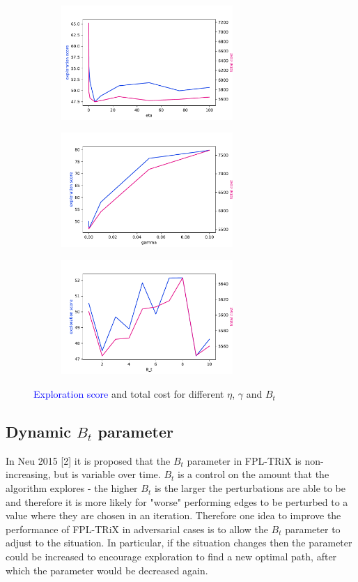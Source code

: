 \begin{figure}[h!]
\centering
\begin{subfigure}{.5\textwidth}
  \centering
  \includegraphics[width=65mm]{../plots/eta_expl_cost.pdf}
\end{subfigure}%
\begin{subfigure}{.5\textwidth}
  \centering
  \includegraphics[width=65mm]{../plots/gamma_expl_cost.pdf}
\end{subfigure}
\begin{subfigure}{.5\textwidth}
  \centering
  \includegraphics[width=65mm]{../plots/Bt_expl_cost.pdf}
\end{subfigure}
\caption{\textcolor{blue}{Exploration score} and \textcolor{RubineRed}{total cost} for different $\eta$, $\gamma$ and $B_t$}
\label{fig:ullm-particle}
\end{figure}


\subsection{Dynamic $B_t$ parameter}

In Neu 2015 [2] it is proposed that the $B_t$ parameter in FPL-TRiX is non-increasing, but is variable over time. $B_t$ is a control on the amount that the algorithm explores - the higher $B_t$ is the larger the perturbations are able to be and therefore it is more likely for "worse" performing edges to be perturbed to a value where they are chosen in an iteration. Therefore   one idea to improve the performance of FPL-TRiX in adversarial cases is to allow the $B_t$ parameter to adjust to the situation. In particular, if the situation changes then the parameter could be increased to encourage exploration to find a new optimal path, after which the parameter would be decreased again.\\

